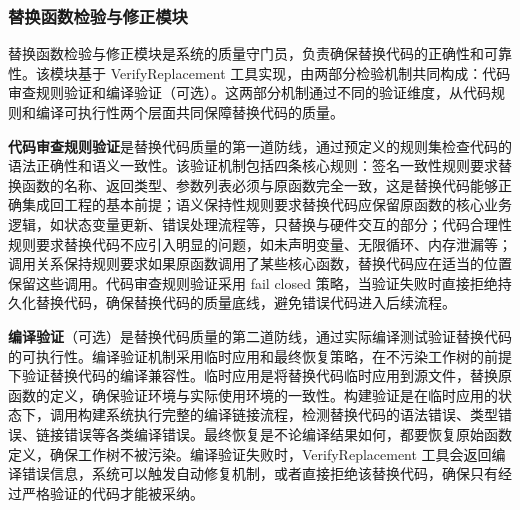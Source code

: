 \subsubsection{替换函数检验与修正模块}

替换函数检验与修正模块是系统的质量守门员，负责确保替换代码的正确性和可靠性。该模块基于 VerifyReplacement 工具实现，由两部分检验机制共同构成：代码审查规则验证和编译验证（可选）。这两部分机制通过不同的验证维度，从代码规则和编译可执行性两个层面共同保障替换代码的质量。

\textbf{代码审查规则验证}是替换代码质量的第一道防线，通过预定义的规则集检查代码的语法正确性和语义一致性。该验证机制包括四条核心规则：签名一致性规则要求替换函数的名称、返回类型、参数列表必须与原函数完全一致，这是替换代码能够正确集成回工程的基本前提；语义保持性规则要求替换代码应保留原函数的核心业务逻辑，如状态变量更新、错误处理流程等，只替换与硬件交互的部分；代码合理性规则要求替换代码不应引入明显的问题，如未声明变量、无限循环、内存泄漏等；调用关系保持规则要求如果原函数调用了某些核心函数，替换代码应在适当的位置保留这些调用。代码审查规则验证采用 fail closed 策略，当验证失败时直接拒绝持久化替换代码，确保替换代码的质量底线，避免错误代码进入后续流程。

\textbf{编译验证}（可选）是替换代码质量的第二道防线，通过实际编译测试验证替换代码的可执行性。编译验证机制采用临时应用和最终恢复策略，在不污染工作树的前提下验证替换代码的编译兼容性。临时应用是将替换代码临时应用到源文件，替换原函数的定义，确保验证环境与实际使用环境的一致性。构建验证是在临时应用的状态下，调用构建系统执行完整的编译链接流程，检测替换代码的语法错误、类型错误、链接错误等各类编译错误。最终恢复是不论编译结果如何，都要恢复原始函数定义，确保工作树不被污染。编译验证失败时，VerifyReplacement 工具会返回编译错误信息，系统可以触发自动修复机制，或者直接拒绝该替换代码，确保只有经过严格验证的代码才能被采纳。
